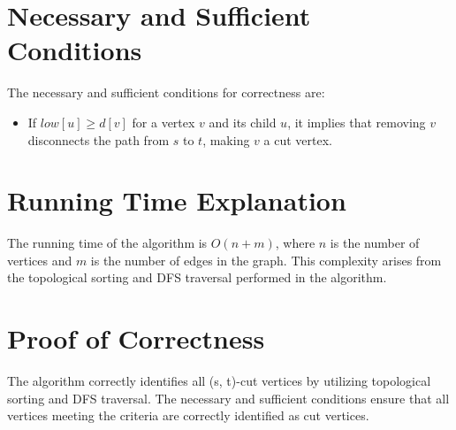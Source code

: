 \documentclass{article}
\begin{document}
\section{Necessary and Sufficient Conditions}
The necessary and sufficient conditions for correctness are:
\begin{itemize}
    \item If $low[u] \geq d[v]$ for a vertex $v$ and its child $u$, it implies that removing $v$ disconnects the path from $s$ to $t$, making $v$ a cut vertex.
\end{itemize}

\section{Running Time Explanation}
The running time of the algorithm is $O(n + m)$, where $n$ is the number of vertices and $m$ is the number of edges in the graph. This complexity arises from the topological sorting and DFS traversal performed in the algorithm.

\section{Proof of Correctness}
The algorithm correctly identifies all (s, t)-cut vertices by utilizing topological sorting and DFS traversal. The necessary and sufficient conditions ensure that all vertices meeting the criteria are correctly identified as cut vertices.
\end{document}
